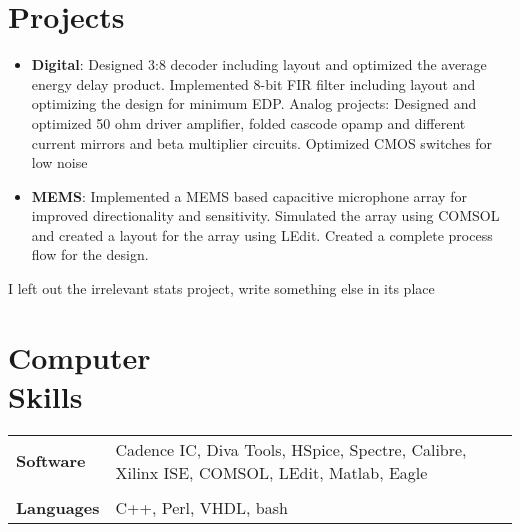 \documentclass[margin]{res}
\begin{document}
\begin{resume}
\section{Projects}
\begin{itemize}
\item
{\bf Digital}: Designed 3:8 decoder including layout and optimized the average energy delay product. Implemented 8-bit FIR filter including layout and optimizing the design for minimum EDP.
Analog projects: Designed and optimized 50 ohm driver amplifier, folded cascode opamp and different current mirrors and beta multiplier circuits. Optimized CMOS switches for low noise
\item
{\bf MEMS}: Implemented a MEMS based capacitive microphone array for improved directionality and sensitivity. Simulated the array using COMSOL and created a layout for the array using LEdit. Created a complete process flow for the design.
\end{itemize}

I left out the irrelevant stats project, write something else in its place

\section{Computer \\ Skills}
   \begin{tabular}{l p{3.5in}}
     	{\bf Software} &  Cadence IC, Diva Tools, HSpice, Spectre, Calibre, Xilinx ISE, COMSOL, LEdit, Matlab, Eagle \\\\
	{\bf Languages} & C++, Perl, VHDL, bash
 \end{tabular}

\end{resume} 
\end{document}
